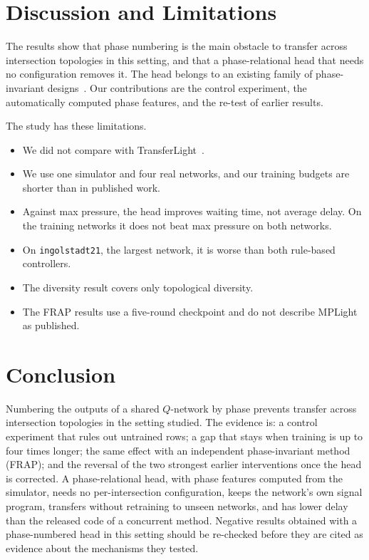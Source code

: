 \documentclass[conference]{IEEEtran}
\begin{document}
\section{Discussion and Limitations}\label{sec:discussion}
The results show that phase numbering is the main obstacle to transfer across intersection
topologies in this setting, and that a phase-relational head that needs no configuration
removes it. The head belongs to an existing family of phase-invariant
designs~\cite{frap,attendlight}. Our contributions are the control experiment, the
automatically computed phase features, and the re-test of earlier results.

The study has these limitations.
\begin{itemize}
\item We did not compare with TransferLight~\cite{transferlight}.
\item We use one simulator and four real networks, and our training budgets are shorter
      than in published work.
\item Against max pressure, the head improves waiting time, not average delay. On the
      training networks it does not beat max pressure on both networks.
\item On \texttt{ingolstadt21}, the largest network, it is worse than both rule-based
      controllers.
\item The diversity result covers only topological diversity.
\item The FRAP results use a five-round checkpoint and do not describe MPLight as
      published.
\end{itemize}

\section{Conclusion}\label{sec:conclusion}
Numbering the outputs of a shared $Q$-network by phase prevents transfer across
intersection topologies in the setting studied. The evidence is: a control experiment that
rules out untrained rows; a gap that stays when training is up to four times longer; the
same effect with an independent phase-invariant method (FRAP); and the reversal of the two
strongest earlier interventions once the head is corrected. A phase-relational head, with
phase features computed from the simulator, needs no per-intersection configuration, keeps
the network's own signal program, transfers without retraining to unseen networks, and has
lower delay than the released code of a concurrent method. Negative results obtained with a
phase-numbered head in this setting should be re-checked before they are cited as evidence
about the mechanisms they tested.
\end{document}
